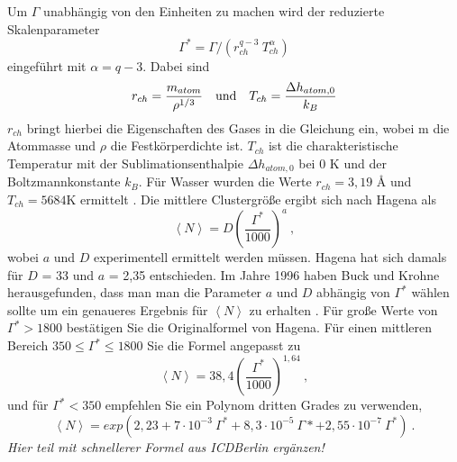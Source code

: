 Um $\Gamma$ unabhängig von den Einheiten zu machen wird der reduzierte Skalenparameter
%
\begin{equation} \label{eq:RedSkalenparameter}
\Gamma^* = \Gamma / (r_{ch}^{q-3}\ T_{ch}^{\alpha})
\end{equation}
%
eingeführt mit $\alpha= q - 3$. Dabei sind
%
\begin{equation}
r_{ch} = \frac{m_{atom}}{\rho ^{1/3}}\quad \textmd{und}\quad T_{ch}= \frac{ \Delta h_{atom,0}}{k_B}
\end{equation}
%
$r_{ch}$ bringt hierbei die Eigenschaften des Gases in die Gleichung ein, wobei m die Atommasse und $\rho$ die Festkörperdichte ist. $T_{ch}$ ist die charakteristische Temperatur mit der Sublimationsenthalpie $\Delta h_{atom,0}$ bei 0 K  und der Boltzmannkonstante $k_B$. Für Wasser wurden die Werte $r_{ch} = 3,19$ \AA{} und $T_{ch} = 5684$K ermittelt \cite{bobbert2002}. Die mittlere Clustergröße ergibt sich nach Hagena als
%
\begin{equation} \label{eq:HagOriginalFormel}
\left\langle N \right\rangle  = D \left( \frac{\Gamma^*}{1000}\right)^a \:,
\end{equation}
%
wobei $a$ und $D$ experimentell ermittelt werden müssen. Hagena hat sich damals für $D$ = 33 und $a$ = 2,35 entschieden. Im Jahre 1996 haben Buck und Krohne herausgefunden, dass man man die Parameter $a$ und $D$ abhängig von $\Gamma^*$ wählen sollte um ein genaueres Ergebnis für $\left\langle N \right\rangle $ zu erhalten \cite{buck1996}. Für große Werte von $\Gamma^* > 1800$ bestätigen Sie die Originalformel von Hagena. 
Für einen mittleren Bereich $350 \leq \Gamma^* \leq 1800$ Sie die Formel angepasst zu
%
\begin{equation}
\left\langle N \right\rangle  = 38,4 \left( \frac{\Gamma^*}{1000}\right)^{1,64} \:,
\end{equation}
%
und für $\Gamma^* < 350$ empfehlen Sie ein Polynom dritten Grades zu verwenden,
%
\begin{equation}
\left\langle N \right\rangle  = exp(2,23 + 7 \cdot 10^{-3}\ \Gamma^* + 8,3 \cdot 10^{-5}\ \Gamma* + 2,55 \cdot 10^{-7}\ \Gamma^* ) \:.
\end{equation}
%
\textit{Hier teil mit schnellerer Formel aus ICDBerlin ergänzen!}
%
%

